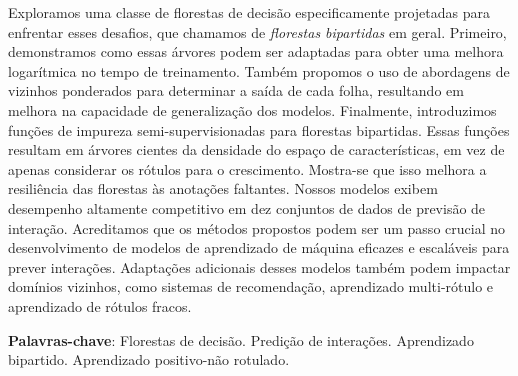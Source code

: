 \begin{resumo}
	Exploramos uma classe de florestas de decisão especificamente projetadas para enfrentar esses desafios, que chamamos de \emph{florestas bipartidas} em geral.
	Primeiro, demonstramos como essas árvores podem ser adaptadas para obter uma melhora logarítmica no tempo de treinamento. Também propomos o uso de abordagens de vizinhos ponderados para determinar a saída de cada folha, resultando em melhora na capacidade de generalização dos modelos.
	Finalmente, introduzimos funções de impureza semi-supervisionadas para florestas bipartidas. Essas funções resultam em árvores cientes da densidade do espaço de características, em vez de apenas considerar os rótulos para o crescimento. Mostra-se que isso melhora a resiliência das florestas às anotações faltantes. Nossos modelos exibem desempenho altamente competitivo em dez conjuntos de dados de previsão de interação.
	Acreditamos que os métodos propostos podem ser um passo crucial no desenvolvimento de modelos de aprendizado de máquina eficazes e escaláveis para prever interações. Adaptações adicionais desses modelos também podem impactar domínios vizinhos, como sistemas de recomendação, aprendizado multi-rótulo e aprendizado de rótulos fracos.

	\textbf{Palavras-chave}: Florestas de decisão. Predição de interações. Aprendizado bipartido. Aprendizado positivo-não rotulado.
\end{resumo}
